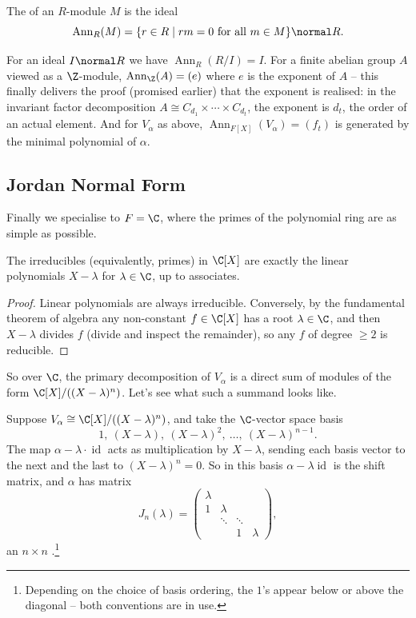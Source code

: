 \begin{definition}[Annihilator]
	The  of an $R$-module $M$ is the ideal
	$$
	\operatorname{Ann}_R(M) = \{r \in R \mid rm = 0 \text{ for all } m \in M\} \normal R.
	$$
\end{definition}

\begin{example}
	For an ideal $I \normal R$ we have $\operatorname{Ann}_R(R/I) = I$. For a finite abelian group $A$ viewed as a $\Z$-module, $\operatorname{Ann}_{\Z}(A) = (e)$ where $e$ is the exponent of $A$ -- this finally delivers the proof (promised earlier) that the exponent is realised: in the invariant factor decomposition $A \cong C_{d_1}\times \cdots \times C_{d_t}$, the exponent is $d_t$, the order of an actual element. And for $V_{\alpha}$ as above, $\operatorname{Ann}_{F[X]}(V_\alpha) = (f_t)$ is generated by the minimal polynomial of $\alpha$.
\end{example}

\subsection{Jordan Normal Form}

Finally we specialise to $F = \C$, where the primes of the polynomial ring are as simple as possible.

\begin{lemma}
	The irreducibles (equivalently, primes) in $\C[X]$ are exactly the linear polynomials $X - \lambda$ for $\lambda \in \C$, up to associates.
\end{lemma}
\begin{proof}
	Linear polynomials are always irreducible. Conversely, by the fundamental theorem of algebra any non-constant $f \in \C[X]$ has a root $\lambda \in \C$, and then $X - \lambda$ divides $f$ (divide and inspect the remainder), so any $f$ of degree $\geq 2$ is reducible.
\end{proof}

So over $\C$, the primary decomposition of $V_{\alpha}$ is a direct sum of modules of the form $\C[X]/((X - \lambda)^n)$. Let's see what such a summand looks like.

\begin{example}
	Suppose $V_{\alpha} \cong \C[X]/((X - \lambda)^n)$, and take the $\C$-vector space basis
	$$
	1,\ (X - \lambda),\ (X - \lambda)^2,\ \dots,\ (X - \lambda)^{n - 1}.
	$$
	The map $\alpha - \lambda \cdot \operatorname{id}$ acts as multiplication by $X - \lambda$, sending each basis vector to the next and the last to $(X - \lambda)^n = 0$. So in this basis $\alpha - \lambda\operatorname{id}$ is the shift matrix, and $\alpha$ has matrix
	$$
	J_n(\lambda) = \begin{pmatrix}
		\lambda & & & \\
		1 & \lambda & & \\
		& \ddots & \ddots & \\
		& & 1 & \lambda
	\end{pmatrix},
	$$
	an $n \times n$ .\footnote{Depending on the choice of basis ordering, the $1$'s appear below or above the diagonal -- both conventions are in use.}
\end{example}

